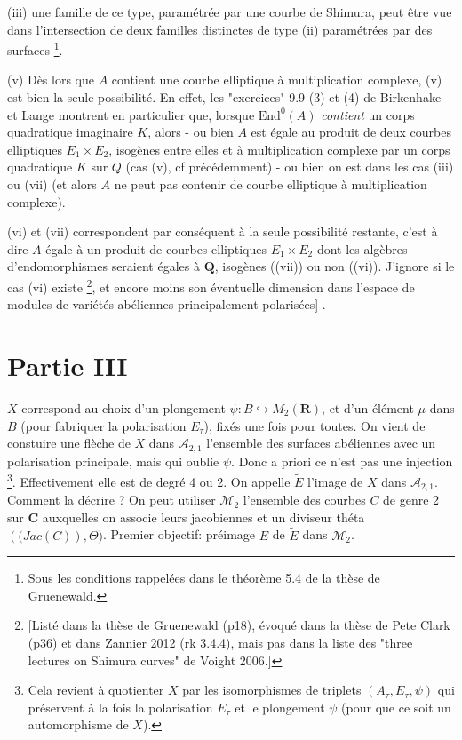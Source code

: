 \documentclass[a4paper, 12pt]{article}
\newcommand\C{\mathbf{C}} \newcommand\Q{\mathbf{Q}} \newcommand\R{\mathbf{R}} \newcommand\Z{\mathbf{Z}} \newcommand\lam{\Lambda}
\newcommand{\End}{\mathrm{End}} \DeclareMathOperator*{\trd}{trd} \DeclareMathOperator*{\nrd}{nrd}
\begin{document}
\begin{itemize}
(iii) une famille de ce type, param\'etr\'ee par une courbe de Shimura, peut \^etre vue dans l'intersection de deux familles distinctes de type (ii) param\'etr\'ees par des surfaces%
\footnote{Sous les conditions rappel\'ees dans le th\'eor\`eme 5.4 de la th\`ese de Gruenewald.}.

(v) D\`es lors que $A$ contient une courbe elliptique \`a multiplication complexe, (v) est bien la seule possibilit\'e. En effet, les "exercices" 9.9 (3) et (4) de Birkenhake et Lange montrent en particulier que, lorsque $\End^0(A)$ \emph{contient} un corps quadratique imaginaire $K$, alors - ou bien $A$ est \'egale au produit de deux courbes elliptiques $E_1\times E_2$, isog\`enes entre elles et \`a multiplication complexe par un corps quadratique $K$ sur $Q$ (cas (v), cf pr\'ec\'edemment) - ou bien on est dans les cas (iii) ou (vii) (et alors $A$ ne peut pas contenir de courbe elliptique \`a multiplication complexe).

(vi) et (vii) correspondent par cons\'equent \`a la seule possibilit\'e restante, c'est \`a dire $A$ \'egale \`a un produit de courbes elliptiques $E_1\times E_2$ dont les alg\`ebres d'endomorphismes seraient \'egales \`a $\Q$, isog\`enes ((vii)) ou non ((vi)). J'ignore si le cas (vi) existe%
\footnote{[List\'e dans la th\`ese de Gruenewald (p18), \'evoqu\'e dans la th\`ese de Pete Clark (p36) et dans Zannier 2012 (rk 3.4.4), mais pas dans la liste des "three lectures on Shimura curves" de Voight 2006.]}, et encore moins son \'eventuelle dimension dans l'espace de modules de vari\'et\'es ab\'eliennes principalement polaris\'ees]%
.
\section{%
Partie III
}%
$X$ correspond au choix d'un plongement $\psi : B \hookrightarrow M_2(\R)$, et d'un \'el\'ement $\mu$ dans $B$ (pour fabriquer la polarisation $E_\tau$), fix\'es une fois pour toutes. On vient de constuire une fl\`eche de $X$ dans $\mathcal{A}_{2,1}$ l'ensemble des surfaces ab\'eliennes avec un polarisation principale, mais qui oublie $\psi$. Donc a priori ce n'est pas une injection
\footnote{Cela revient \`a quotienter $X$ par les isomorphismes de triplets $(A_\tau,E_\tau,\psi)$ qui pr\'eservent \`a la fois la polarisation $E_\tau$ et le plongement $\psi$ (pour que ce soit un automorphisme de $X$).}. 
Effectivement elle est de degr\'e 4 ou 2.
On appelle $\tilde{E}$ l'image de $X$ dans $\mathcal{A}_{2,1}$.
Comment la d\'ecrire ?
On peut utiliser $\mathcal{M}_2$ l'ensemble des courbes $C$ de genre 2 sur $\C$ auxquelles on associe leurs jacobiennes et un diviseur th\'eta $(\mathrm(Jac(C)), \Theta)$.
Premier objectif: pr\'eimage $E$ de $\tilde{E}$ dans $\mathcal{M}_2$.


\end{itemize}
\end{document}
